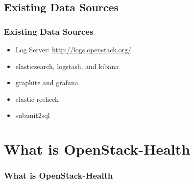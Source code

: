 \documentclass[aspectratio=169,11pt,hyperref={colorlinks=true}]{beamer}
\begin{document}
\subsection{Existing Data Sources}
\begin{frame}
    \frametitle{Existing Data Sources}
    \begin{itemize}
        \item Log Server: \href{http://logs.openstack.org/}{http://logs.openstack.org/}
        \item elasticsearch, logstash, and kibana
        \item graphite and grafana
        \item elastic-recheck
        \item subunit2sql
    \end{itemize}
\end{frame}

\section{What is OpenStack-Health}
\begin{frame}
    \frametitle{What is OpenStack-Health}
\end{frame}
\end{document}
